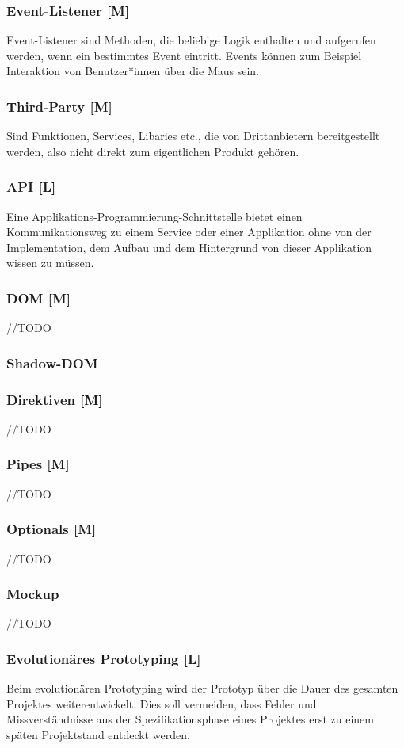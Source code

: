 \subsubsection{Event-Listener [M]}
\label{txt:glos:event-listener}
Event-Listener sind Methoden, die beliebige Logik enthalten und aufgerufen werden, wenn ein bestimmtes Event eintritt. Events können zum Beispiel Interaktion von Benutzer*innen über die Maus sein. 

\subsubsection{Third-Party [M]}
Sind Funktionen, Services, Libaries etc., die von Drittanbietern bereitgestellt werden, also nicht direkt zum eigentlichen Produkt gehören. 

\subsubsection{API [L]}
\label{txt:glos:API}
Eine Applikations-Programmierung-Schnittstelle bietet einen Kommunikationsweg zu einem Service oder einer Applikation ohne von der Implementation, dem Aufbau und dem Hintergrund von dieser Applikation wissen zu müssen. \cite{WhatApi}

\subsubsection{DOM [M]}
\label{txt:glos:DOM}
//TODO 
\subsubsection{Shadow-DOM}


\subsubsection{Direktiven [M]}
//TODO

\subsubsection{Pipes [M]}
//TODO

\subsubsection{Optionals [M]}
//TODO

\subsubsection{Mockup}
//TODO


\subsubsection{Evolutionäres Prototyping [L]}
\label{ch::ongoing-prototyping}
Beim evolutionären Prototyping wird der Prototyp über die Dauer des gesamten Projektes weiterentwickelt. Dies soll vermeiden, dass Fehler und Missverständnisse aus der Spezifikationsphase eines Projektes erst zu einem späten Projektstand entdeckt werden. \cite{Prototyping}